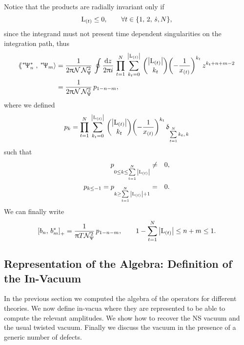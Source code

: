 Notice that the products are radially invariant only if
\begin{equation}
  \mathrm{L}_{(t)} \le 0,
  \qquad
  \forall t \in \qty{ 1,\, 2,\, \ensuremath{\dot{s}}, N },
  \label{eq:generic-case-negativity-condition}
\end{equation}
since the integrand must not present time dependent singularities on the integration path, thus
\begin{equation}
  \begin{split}
    \lconsprod{\dual{\Psi}_n^*}{\dual{\Psi}_m} 
    & =
    \frac{1}{2 \pi \cN\, \cN_{\Psi}^2}\,
    \oint \ddz\,
    \finiteprod{t}{1}{N}\,
    \finitesum{k_t}{0}{\abs{\rL_{(t)}}}\,
    \binom{\abs{\rL_{(t)}}}{k_t}
    \qty( - \frac{1}{x_{(t)}} )^{k_t}\,
    z^{k_t + n + m - 2}
    \\
    & =
    \frac{1}{2 \pi \cN\, \cN_{\Psi}^2}\, p_{1 - n - m},
  \end{split}
\end{equation}
where we defined
\begin{equation}
  p_k
  =
  \prod\limits_{t = 1}^{N}\,
  \sum\limits_{k_t = 0}^{\abs{\mathrm{L}_{(t)}}}\,
  \binom{\abs{\mathrm{L}_{(t)}}}{k_t}
  \qty( - \frac{1}{x_{(t)}} )^{k_t}\,
  \updelta_{\sum\limits_{t = 1}^{N} k_t,\, k}
  \label{eq:generic-conserved-product-factor}
\end{equation}
such that
\begin{eqnarray}
  p_{0 \le k \le \sum\limits_{t = 1}^{N} \abs{\mathrm{L}_{(t)}}}
  & \neq &
  0,
  \\
  p_{k \le -1}
  =
  p_{k \ge \sum\limits_{t = 1}^{N} \abs{\mathrm{L}_{(t)}} + 1}
  & = &
  0.
\end{eqnarray}
We can finally write
\begin{equation}
  \left[ b_n,\, b^*_m \right]_+
  =
  \frac{1}{\uppi T \mathcal{N}_{\Uppsi}^2}\, p_{1 - n - m},
  \qquad
  1 - \sum\limits_{t = 1}^{N} \abs{\mathrm{L}_{(t)}} \le n + m \le 1.
  \label{eq:generic-case-anti-commutation}
\end{equation}


\subsection{Representation of the Algebra: Definition of the In-Vacuum}
\label{sec:invacuum}
  
In the previous section we computed the algebra of the operators for different theories.
We now define in-vacua where they are represented to be able to compute the relevant amplitudes.
We show how to recover the NS vacuum and the usual twisted vacuum.
Finally we discuss the vacuum in the presence of a generic number of defects.
  


